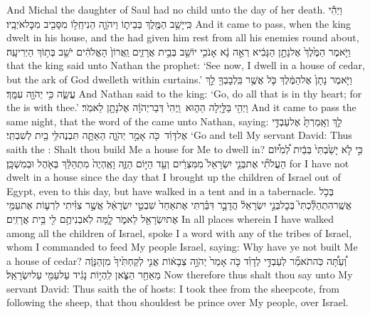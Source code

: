 {And Michal the daughter of Saul had no child unto the day of her death.}
\newperek
{}
{וַיְהִ֕י כִּֽי\maqqaf יָשַׁ֥ב הַמֶּ֖לֶךְ בְּבֵית֑וֹ וַיהֹוָ֛ה הֵנִיחַֽ\maqqaf ל֥וֹ מִסָּבִ֖יב מִכׇּל\maqqaf אֹיְבָֽיו׃}
{And it came to pass, when the king dwelt in his house, and the \lord\space had given him rest from all his enemies round about,}
{וַיֹּ֤אמֶר הַמֶּ֙לֶךְ֙ אֶל\maqqaf נָתָ֣ן הַנָּבִ֔יא רְאֵ֣ה נָ֔א אָנֹכִ֥י יוֹשֵׁ֖ב בְּבֵ֣ית אֲרָזִ֑ים וַֽאֲרוֹן֙ הָאֱלֹהִ֔ים יֹשֵׁ֖ב בְּת֥וֹךְ הַיְרִיעָֽה׃}
{that the king said unto Nathan the prophet: ‘See now, I dwell in a house of cedar, but the ark of God dwelleth within curtains.’}
{וַיֹּ֤אמֶר נָתָן֙ אֶל\maqqaf הַמֶּ֔לֶךְ כֹּ֛ל אֲשֶׁ֥ר בִּֽלְבָבְךָ֖ לֵ֣ךְ עֲשֵׂ֑ה כִּ֥י יְהֹוָ֖ה עִמָּֽךְ׃}
{And Nathan said to the king: ‘Go, do all that is in thy heart; for the \lord\space is with thee.’}
{וַיְהִ֖י בַּלַּ֣יְלָה הַה֑וּא \setuma  וַֽיְהִי֙ דְּבַר\maqqaf יְהֹוָ֔ה אֶל\maqqaf נָתָ֖ן לֵאמֹֽר׃}
{And it came to pass the same night, that the word of the \lord\space came unto Nathan, saying:}
{לֵ֤ךְ וְאָֽמַרְתָּ֙ אֶל\maqqaf עַבְדִּ֣י אֶל\maqqaf דָּוִ֔ד \setuma  כֹּ֖ה אָמַ֣ר יְהֹוָ֑ה הַאַתָּ֛ה תִּבְנֶה\maqqaf לִּ֥י בַ֖יִת לְשִׁבְתִּֽי׃}
{‘Go and tell My servant David: Thus saith the \lord: Shalt thou build Me a house for Me to dwell in?}
{כִּ֣י לֹ֤א יָשַׁ֙בְתִּי֙ בְּבַ֔יִת לְ֠מִיּ֠וֹם הַעֲלֹתִ֞י אֶת\maqqaf בְּנֵ֤י יִשְׂרָאֵל֙ מִמִּצְרַ֔יִם וְעַ֖ד הַיּ֣וֹם הַזֶּ֑ה וָאֶֽהְיֶה֙ מִתְהַלֵּ֔ךְ בְּאֹ֖הֶל וּבְמִשְׁכָּֽן׃}
{for I have not dwelt in a house since the day that I brought up the children of Israel out of Egypt, even to this day, but have walked in a tent and in a tabernacle.}
{בְּכֹ֥ל אֲשֶֽׁר\maqqaf הִתְהַלַּ֘כְתִּי֮ בְּכׇל\maqqaf בְּנֵ֣י יִשְׂרָאֵל֒ הֲדָבָ֣ר דִּבַּ֗רְתִּי אֶת\maqqaf אַחַד֙ שִׁבְטֵ֣י יִשְׂרָאֵ֔ל אֲשֶׁ֣ר צִוִּ֗יתִי לִרְע֛וֹת אֶת\maqqaf עַמִּ֥י אֶת\maqqaf יִשְׂרָאֵ֖ל לֵאמֹ֑ר לָ֛מָּה לֹֽא\maqqaf בְנִיתֶ֥ם לִ֖י בֵּ֥ית אֲרָזִֽים׃}
{In all places wherein I have walked among all the children of Israel, spoke I a word with any of the tribes of Israel, whom I commanded to feed My people Israel, saying: Why have ye not built Me a house of cedar?}
{וְ֠עַתָּ֠ה כֹּֽה\maqqaf תֹאמַ֞ר לְעַבְדִּ֣י לְדָוִ֗ד כֹּ֤ה אָמַר֙ יְהֹוָ֣ה צְבָא֔וֹת אֲנִ֤י לְקַחְתִּ֙יךָ֙ מִן\maqqaf הַנָּוֶ֔ה מֵאַחַ֖ר הַצֹּ֑אן לִֽהְי֣וֹת נָגִ֔יד עַל\maqqaf עַמִּ֖י עַל\maqqaf יִשְׂרָאֵֽל׃}
{Now therefore thus shalt thou say unto My servant David: Thus saith the \lord\space of hosts: I took thee from the sheepcote, from following the sheep, that thou shouldest be prince over My people, over Israel.}
